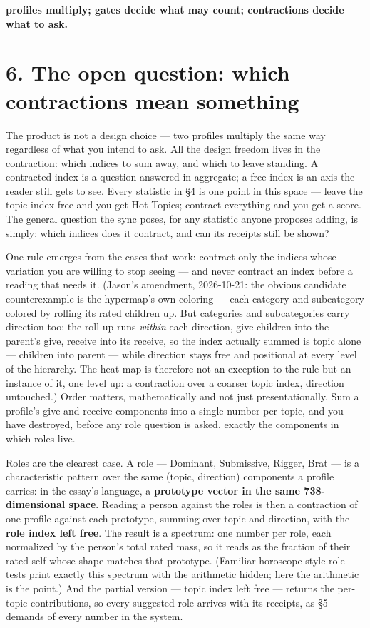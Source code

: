 \textbf{profiles multiply; gates decide what may count; contractions
decide what to ask.}

\section{6. The open question: which contractions mean
something}\label{the-open-question-which-contractions-mean-something}

The product is not a design choice --- two profiles multiply the same
way regardless of what you intend to ask. All the design freedom lives
in the contraction: which indices to sum away, and which to leave
standing. A contracted index is a question answered in aggregate; a free
index is an axis the reader still gets to see. Every statistic in \S 4 is
one point in this space --- leave the topic index free and you get Hot
Topics; contract everything and you get a score. The general question
the sync poses, for any statistic anyone proposes adding, is simply:
which indices does it contract, and can its receipts still be shown?

One rule emerges from the cases that work: contract only the indices
whose variation you are willing to stop seeing --- and never contract an
index before a reading that needs it. (Jason's amendment, 2026-10-21:
the obvious candidate counterexample is the hypermap's own coloring ---
each category and subcategory colored by rolling its rated children up.
But categories and subcategories carry direction too: the roll-up runs
\emph{within} each direction, give-children into the parent's give,
receive into its receive, so the index actually summed is topic alone
--- children into parent --- while direction stays free and positional
at every level of the hierarchy. The heat map is therefore not an
exception to the rule but an instance of it, one level up: a contraction
over a coarser topic index, direction untouched.) Order matters,
mathematically and not just presentationally. Sum a profile's give and
receive components into a single number per topic, and you have
destroyed, before any role question is asked, exactly the components in
which roles live.

Roles are the clearest case. A role --- Dominant, Submissive, Rigger,
Brat --- is a characteristic pattern over the same (topic, direction)
components a profile carries: in the essay's language, a
\textbf{prototype vector in the same 738-dimensional space}. Reading a
person against the roles is then a contraction of one profile against
each prototype, summing over topic and direction, with the \textbf{role
index left free}. The result is a spectrum: one number per role, each
normalized by the person's total rated mass, so it reads as the fraction
of their rated self whose shape matches that prototype. (Familiar
horoscope-style role tests print exactly this spectrum with the
arithmetic hidden; here the arithmetic is the point.) And the partial
version --- topic index left free --- returns the per-topic
contributions, so every suggested role arrives with its receipts, as \S 5
demands of every number in the system.

